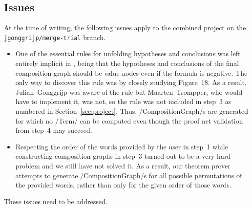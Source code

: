 \documentclass[12pt,a4paper]{article}
\begin{document}
\subsection{Issues}\label{sub:issues}

At the time of writing, the following issues apply to the combined project on the \texttt{jgonggrijp/merge-trial} branch.
\begin{itemize}
    \item One of the essential rules for unfolding hypotheses and conclusions was left entirely implicit in \cite{mm12}, being that the hypotheses and conclusions of the final composition graph should be value nodes even if the formula is negative. The only way to discover this rule was by closely studying Figure~18. As a result, Julian~Gonggrijp was aware of the rule but Maarten~Trompper, who would have to implement it, was not, so the rule was not included in step~3 as numbered in Section~\ref{sec:project}. Thus, \hs/CompositionGraph/s are generated for which no \hs/Term/ can be computed even though the proof net validation from step~4 may succeed.
    \item Respecting the order of the words provided by the user in step~1 while constructing composition graphs in step~3 turned out to be a very hard problem and we still have not solved it. As a result,  our theorem prover attempts to generate \hs/CompositionGraph/s for all possible permutations of the provided words, rather than only for the given order of those words.
\end{itemize}
These issues need to be addressed.
\end{document}
